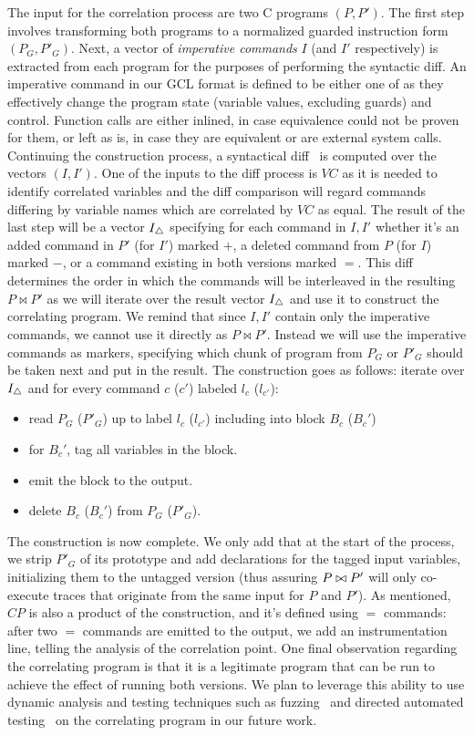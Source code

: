 The input for the correlation process are two C programs $(P,P')$. The first step involves transforming both programs to a normalized guarded instruction form $(P_{G},P'_{G})$. Next, a vector of \emph{imperative commands} $I$ (and $I'$ respectively) is extracted from each program for the purposes of performing the syntactic diff. An imperative command in our GCL format is defined to be either one of  as they effectively change the program state (variable values, excluding guards) and control. Function calls are either inlined, in case equivalence could not be proven for them, or left as is, in case they are equivalent or are external system calls. Continuing the construction process, a syntactical diff~\cite{HuntMcIlroy75} is computed over the vectors $(I,I')$. One of the inputs to the diff process is $VC$ as it is needed to identify correlated variables and the diff comparison will regard commands differing by variable names which are correlated by $VC$ as equal. The result of the last step will be a vector $I_{\triangle}$ specifying for each command in $I,I'$ whether it's an added command in $P'$ (for $I'$) marked $+$, a deleted command from $P$ (for $I$) marked $-$, or a command existing in both versions marked $=$. This diff determines the order in which the commands will be interleaved in the resulting $P \bowtie P'$ as we will iterate over the result vector $I_{\triangle}$ and use it to construct the correlating program. We remind that since $I,I'$ contain only the imperative commands, we cannot use it directly as $P \bowtie P'$. Instead we will use the imperative commands as markers, specifying which chunk of program from $P_G$ or $P'_G$ should be taken next and put in the result. The construction goes as follows: iterate over $I_{\triangle}$ and for every command $c$ ($c'$) labeled $l_c$ ($l_{c'}$):
\begin{itemize}
\item read $P_G$ ($P'_G$) up to label $l_c$ ($l_{c'}$) including into block $B_c$ ($B_c'$)
\item for $B_c'$, tag all variables in the block.
\item emit the block to the output.
\item delete $B_c$ ($B_c'$) from $P_G$ ($P'_G$).
\end{itemize}
The construction is now complete. We only add that at the start of the process, we strip $P'_G$ of its prototype and add declarations for the tagged input variables, initializing them to the untagged version (thus assuring $P \bowtie P'$ will only co-execute traces that originate from the same input for $P$ and $P'$).
As mentioned, $CP$ is also a product of the construction, and it's defined using $=$ commands: after two $=$ commands are emitted to the output, we add an instrumentation line, telling the analysis of the correlation point.
One final observation regarding the correlating program is that it is a legitimate program that can be run to achieve the effect of running both versions. We plan to leverage this ability to use dynamic analysis and testing techniques such as fuzzing~\cite{NethercoteSeward07} and directed automated testing~\cite{CadarDunbarEngler08} on the correlating program in our future work.

